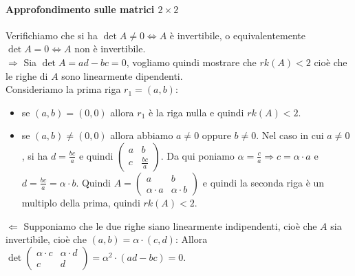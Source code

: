 \documentclass[a4paper]{article}
\theoremstyle{definition}
\begin{document}
\paragraph{Approfondimento sulle matrici $2 \times 2$}
Verifichiamo che si ha $\det A \ne 0 \Leftrightarrow A$ è invertibile, o equivalentemente $\det A = 0 \Leftrightarrow A$ non è invertibile. \\
$\Rightarrow$ Sia $\det A = ad - bc = 0$, vogliamo quindi mostrare che $rk(A) < 2$ cioè che le righe di $A$ sono linearmente dipendenti. \\
Consideriamo la prima riga $r_1 = (a, b)$:
\begin{itemize}
\item se $(a, b) = (0, 0)$ allora $r_1$ è la riga nulla e quindi $rk(A) < 2$.
\item se $(a, b) \ne (0, 0)$ allora abbiamo $a \ne 0$ oppure $b \ne 0$.
	Nel caso in cui $a \ne 0$, si ha $d = \frac{bc}{a}$ e quindi $\begin{pmatrix}
	a & b \\
	c & \frac{bc}{a}
	\end{pmatrix}$.
	Da qui poniamo $\alpha = \frac{c}{a} \Rightarrow c = \alpha \cdot a$ e $d = \frac{bc}{a} = \alpha \cdot b$.
	Quindi $A = \begin{pmatrix}
	a & b \\
	\alpha \cdot a & \alpha \cdot b
	\end{pmatrix}$ e quindi la seconda riga è un multiplo della prima, quindi $rk(A) < 2$.
\end{itemize}
$\Leftarrow$ Supponiamo che le due righe siano linearmente indipendenti, cioè che $A$ sia invertibile, cioè che $(a, b) = \alpha \cdot (c, d)$:
Allora $\det \begin{pmatrix}
	\alpha \cdot c & \alpha \cdot d \\
	c & d
\end{pmatrix} = \alpha^2 \cdot (ad - bc) = 0$.
\end{document}
